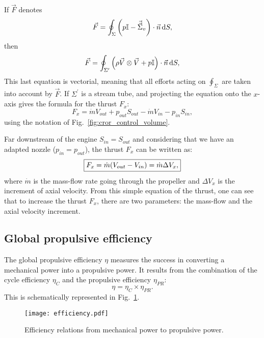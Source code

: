 If $\vec{F}$ denotes
\begin{equation}
	\vec{F} = \oint_{\Sigma} \left(p \mathbb{I} - 
	\vec{\vec{\Sigma}}_v \right) \cdot \vec{n} \mathop{}\!\mathrm{d} S,
\end{equation}
then
\begin{equation}
	\vec{F} = \oint_{\Sigma^\prime} \left(\rho \vec{V} \otimes \vec{V} +
	p \mathbb{I} \right) \cdot \vec{n} \mathop{}\!\mathrm{d} S,
\end{equation}
This last equation is vectorial, meaning that all efforts acting on 
$\oint_{\Sigma}$ are taken into account by $\vec{F}$.
If $\Sigma^\prime$ is a stream tube, and projecting the equation
onto the $x$-axis gives the formula for the thrust $F_x$:
\begin{equation}
	F_x = \dot{m} V_{out} + p_{out} S_{out}
	- \dot{m} V_{in} - p_{in} S_{in},
\end{equation}
using the notation of Fig.~\ref{fig:cror_control_volume}.

Far downstream of the engine $S_{in} = S_{out}$ and
considering that we have an adapted nozzle ($p_{in} = p_{out}$),
the thrust $F_x$ can be written as:
\begin{equation}
	\fbox{$
	F_x = \dot{m} (V_{out} - V_{in}) = \dot{m} \Delta V_x,
	$}
	\label{eq:cror_thrust}
\end{equation}
where $\dot{m}$ is the mass-flow rate going through the
propeller and $\Delta V_x$ is
the increment of axial velocity. From this simple equation of the thrust,
one can see that to increase the thrust $F_x$, there are two parameters:
the mass-flow and the axial velocity increment.

\subsection{Global propulsive efficiency}
\label{sub:cror_efficiency}

The global propulsive efficiency $\eta$ measures the 
success in converting a mechanical power into a
propulsive power. It results from the combination
of the cycle efficiency $\eta_{C}$ and the propulsive efficiency
$\eta_{PR}$:
\begin{equation}
	\eta = \eta_{C} \times \eta_{PR}.
\end{equation}
This is schematically represented in Fig.~\ref{fig:cror_efficiency}.
\begin{figure}[htb]
  \centering
  \texttt{[image: efficiency.pdf]}
  \caption{Efficiency relations from mechanical power to propulsive power.}
  \label{fig:cror_efficiency}
\end{figure}



